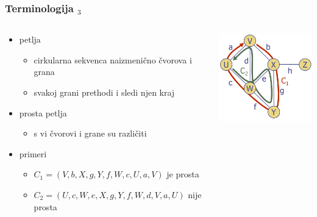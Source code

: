 \documentclass[compress]{beamer}
\begin{document}
\begin{frame}[fragile]
  \frametitle{Terminologija $_{3}$}
  \begin{columns}
    \begin{column}[t]{7.5cm}
      \begin{itemize}
        \item petlja
        \begin{itemize}
          \item cirkularna sekvenca naizmenično čvorova i grana
          \item svakoj grani prethodi i sledi njen kraj
        \end{itemize}
        \item prosta petlja
        \begin{itemize}
          \item s vi čvorovi i grane su različiti
        \end{itemize}
        \item primeri
        \begin{itemize}
          \item $C_{1}=(V,b,X,g,Y,f,W,c,U,a,V)$ je prosta
          \item $C_{2}=(U,c,W,e,X,g,Y,f,W,d,V,a,U)$ nije prosta
        \end{itemize}
      \end{itemize}
    \end{column}
    \begin{column}[t]{4.5cm}
      \begin{center}
        \includegraphics[width=4.5cm]{asp-14-pic06.png}
      \end{center}
    \end{column}
  \end{columns}
\end{frame}
\end{document}
